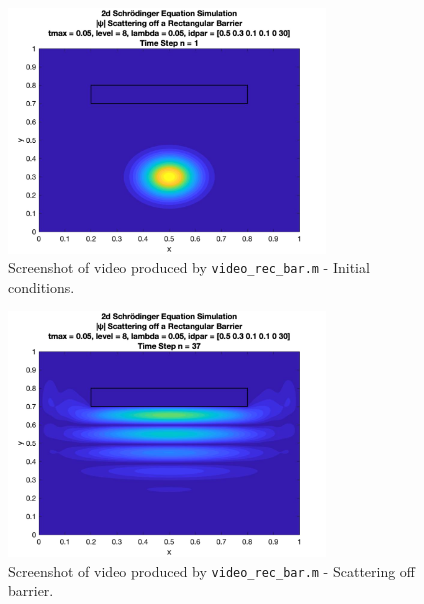 \documentclass[10pt]{article}
\def\code#1{\texttt{#1}} %
\begin{document}
\begin{figure}[H]
\centering
\includegraphics[width=0.75\textwidth]{problem2/rec_bar_1.png}
\caption{Screenshot of video produced by \code{video\_rec\_bar.m} - Initial conditions.}
\end{figure}
\begin{figure}[H]
\centering
\includegraphics[width=0.75\textwidth]{problem2/rec_bar_2.png}
\caption{Screenshot of video produced by \code{video\_rec\_bar.m} - Scattering off barrier.}
\end{figure}
\end{document}
